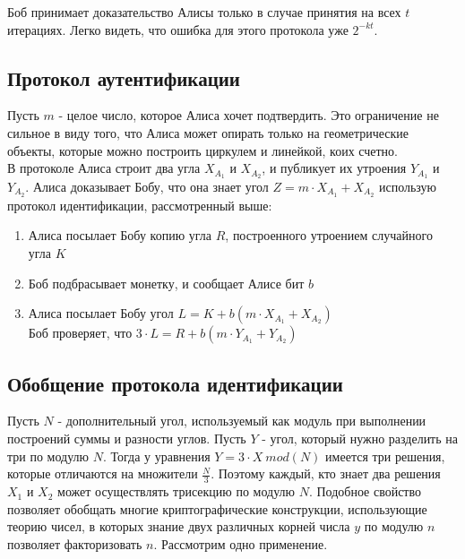 \documentclass{report}%
\begin{document}
\noindent Боб принимает доказательство Алисы только в случае принятия на всех $t$ итерациях.
Легко видеть, что ошибка для этого протокола уже $2^{-kt}$.

\subsection{Протокол аутентификации}

Пусть $m$ - целое число, которое Алиса хочет подтвердить. Это ограничение не сильное
в виду того, что Алиса может опирать только на геометрические объекты, которые можно
построить циркулем и линейкой, коих счетно.~\\

\noindent В протоколе Алиса строит два угла $X_{A_1}$ и $X_{A_2}$, и публикует их утроения
$Y_{A_1}$ и $Y_{A_2}$. Алиса доказывает Бобу, что она знает угол $Z = m \cdot X_{A_1} + X_{A_2}$
использую протокол идентификации, рассмотренный выше:

\begin{enumerate}
	\item Алиса посылает Бобу копию угла $R$, построенного утроением случайного угла $K$
	\item Боб подбрасывает монетку, и сообщает Алисе бит $b$
	\item Алиса посылает Бобу угол $L = K + b(m \cdot X_{A_1} + X_{A_2})$~\\
		Боб проверяет, что $3 \cdot L = R + b(m \cdot Y_{A_1} + Y_{A_2})$
\end{enumerate}

\subsection{Обобщение протокола идентификации}

Пусть $N$ - дополнительный угол, используемый как модуль при выполнении построений
суммы и разности углов. Пусть $Y$ - угол, который нужно разделить на три по модулю $N$.
Тогда у уравнения $Y = 3 \cdot X\ mod(N)$ имеется три решения, которые отличаются на
множители $\frac{N}{3}$. Поэтому каждый, кто знает два решения $X_1$ и $X_2$ может
осуществлять трисекцию по модулю $N$. Подобное свойство позволяет обобщать многие 
криптографические конструкции, использующие теорию чисел, в которых знание двух
различных корней числа $y$ по модулю $n$ позволяет факторизовать $n$. Рассмотрим
одно применение.~\\
\end{document}
